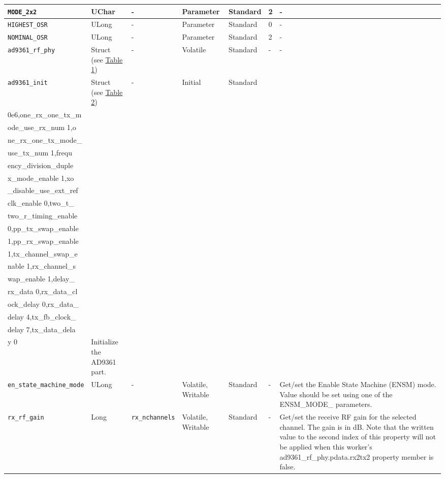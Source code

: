 \documentclass{article}
\begin{document}
\begin{landscape}
\begin{scriptsize}
\begin{longtable}{|p{3.6cm}|p{8.1cm}|p{1.4cm}|p{1.3cm}|p{1.4cm}|p{2.5cm}|p{3.6cm}|}
			\hline
      \verb+MODE_2x2+                  & UChar        & -               & Parameter             & Standard                         & 2                   & - \\
			\hline
      \verb+HIGHEST_OSR+               & ULong        & -               & Parameter             & Standard                         & 0                   & - \\
			\hline
      \verb+NOMINAL_OSR+               & ULong        & -               & Parameter             & Standard                         & 2                   & - \\
			\hline
			\verb+ad9361_rf_phy+ & Struct (see \hyperlink{tab1}{Table 1})  & - & Volatile & Standard & - & - \\
			\hline
			\verb+ad9361_init+ & Struct (see \hyperlink{tab2}{Table 2}) & - & Initial & Standard & \begin{tabular}{l}reference\_clk\_rate 4\\0e6,one\_rx\_one\_tx\_m\\ode\_use\_rx\_num 1,o\\ne\_rx\_one\_tx\_mode\_\\use\_tx\_num 1,frequ\\ency\_division\_duple\\x\_mode\_enable 1,xo\\\_disable\_use\_ext\_ref\\clk\_enable 0,two\_t\_\\two\_r\_timing\_enable\\ 0,pp\_tx\_swap\_enable\\ 1,pp\_rx\_swap\_enable\\ 1,tx\_channel\_swap\_e\\nable 1,rx\_channel\_s\\wap\_enable 1,delay\_\\rx\_data 0,rx\_data\_cl\\ock\_delay 0,rx\_data\_\\delay 4,tx\_fb\_clock\_\\delay 7,tx\_data\_dela\\y 0\end{tabular} & Initialize the AD9361 part. \\
			\hline
			\verb+en_state_machine_mode+ & ULong & - & Volatile, Writable & Standard & - & Get/set the Enable State Machine (ENSM) mode. Value should be set using one of the ENSM\_MODE\_ parameters.\\
			\hline
			\verb+rx_rf_gain+ & Long & \verb+rx_nchannels+ & Volatile, Writable & Standard & - & Get/set the receive RF gain for the selected channel. The gain is in dB. Note that the written value to the second index of this property will not be applied when this worker's ad9361\_rf\_phy.pdata.rx2tx2 property member is false.\\

\end{longtable}
\end{scriptsize}
\end{landscape}
\end{document}
